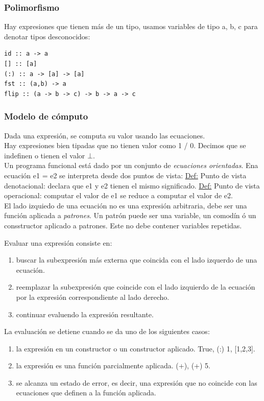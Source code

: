 \documentclass[12pt]{extarticle}
\def\definicion{\newline\underline{Def:} }
\begin{document}
\subsubsection{Polimorfismo}
Hay expresiones que tienen más de un tipo, usamos variables de tipo a, b, c para denotar tipos desconocidos:

\begin{verbatim}
id :: a -> a
[] :: [a]
(:) :: a -> [a] -> [a]
fst :: (a,b) -> a
flip :: (a -> b -> c) -> b -> a -> c
\end{verbatim}

\subsubsection{Modelo de cómputo}
Dada una expresión, se computa su valor usando las ecuaciones. \\
Hay expresiones bien tipadas que no tienen valor como 1 / 0. Decimos que se indefinen o tienen el valor $\bot$. \\
Un programa funcional está dado por un conjunto de \textit{ecuaciones orientadas}. Ena ecuación e1 = e2 se interpreta desde dos puntos de vista:
\definicion Punto de vista denotacional: declara que e1 y e2 tienen el mismo significado.
\definicion Punto de vista operacional: computar el valor de e1 se reduce a computar el valor de e2. \\
El lado izquiedo de una ecuación no es una expresión arbitraria, debe ser una función aplicada a \textit{patrones}. Un patrón puede ser una variable, un comodín ó un consstructor aplicado a patrones. Este no debe contener variables repetidas.

Evaluar una expresión consiste en:
\begin{enumerate}
\itemsep-0.35em 
\item buscar la subexpresión más externa que coincida con el lado izquerdo de una ecuación.
\item reemplazar la subexpresión que coincide con el lado izquierdo de la ecuación por la expresión correspondiente al lado derecho.
\item continuar evaluendo la expresión resultante.
\end{enumerate}

La evaluación se detiene cuando se da uno de los siguientes casos:
\begin{enumerate}
\itemsep-0.35em 
\item la expresión en un constructor o un constructor aplicado. True, (:) 1, [1,2,3].
\item la expresión es una función parcialmente aplicada. (+), (+) 5.
\item se alcanza un estado de error, es decir, una expresión que no coincide con las ecuaciones que definen a la función aplicada.
\end{enumerate}
\end{document}
